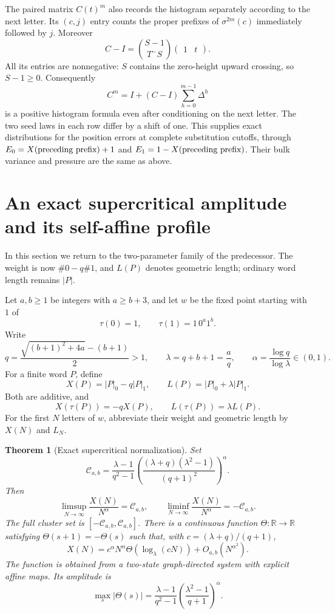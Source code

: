 \documentclass[11pt]{article}
\numberwithin{equation}{section}
\newtheorem{theorem}{Theorem}[section]
\theoremstyle{definition}
\theoremstyle{remark}
\begin{document}
The paired matrix $C(t)^m$ also records the histogram separately
according to the next letter. Its $(c,j)$ entry counts the proper
prefixes of $\sigma^{2m}(c)$ immediately followed by $j$.
Moreover
\begin{equation}\label{bmf:eq:rankone}
 C-I=
 \binom{S-1}{T^-S}\begin{pmatrix}1&t\end{pmatrix}.
\end{equation}
All its entries are nonnegative: $S$ contains the zero-height
upward crossing, so $S-1\geq0$.
Consequently
\begin{equation}\label{bmf:eq:conditioned}
 C^m=I+(C-I)\sum_{h=0}^{m-1}\Delta^h
\end{equation}
is a positive histogram formula even after conditioning on the
next letter. The two seed laws in each row differ by a shift
of one. This supplies exact distributions for the position
errors at complete substitution cutoffs, through
$E_0=X(\hbox{preceding prefix})+1$ and
$E_1=1-X(\hbox{preceding prefix})$.
Their bulk variance and pressure are the same as above.

\section{An exact supercritical amplitude and its self-affine profile}
\label{bmf:sec:supercritical}

In this section we return to the two-parameter family of the predecessor.
The weight is now $\#0-q\#1$, and $L(P)$ denotes geometric length;
ordinary word length remains $|P|$.

Let $a,b\geq1$ be integers with $a\geq b+3$, and let $w$ be the
fixed point starting with $1$ of
\[
 \tau(0)=1,\qquad \tau(1)=1\,0^a1^b.
\]
Write
\[
 q=\frac{\sqrt{(b+1)^2+4a}-(b+1)}2>1,\qquad
 \lambda=q+b+1=\frac aq,\qquad
 \alpha=\frac{\log q}{\log\lambda}\in(0,1).
\]
For a finite word $P$, define
\[
 X(P)=|P|_0-q|P|_1,\qquad
 L(P)=|P|_0+\lambda |P|_1.
\]
Both are additive, and
\[
 X(\tau(P))=-qX(P),\qquad L(\tau(P))=\lambda L(P).
\]
For the first $N$ letters of $w$, abbreviate their weight and geometric
length by $X(N)$ and $L_N$.

\begin{theorem}[Exact supercritical normalization]
\label{bmf:thm:supercritical-amplitude}
Set
\[
 \mathcal C_{a,b}=
 \frac{\lambda-1}{q^2-1}
 \left(\frac{(\lambda+q)(\lambda^2-1)}{(q+1)^2}\right)^\alpha.
\]
Then
\[
 \limsup_{N\to\infty}\frac{X(N)}{N^\alpha}=\mathcal C_{a,b},
 \qquad
 \liminf_{N\to\infty}\frac{X(N)}{N^\alpha}=-\mathcal C_{a,b}.
\]
The full cluster set is $[-\mathcal C_{a,b},\mathcal C_{a,b}]$.
There is a continuous function $\Theta:\mathbb R\to\mathbb R$ satisfying
$\Theta(s+1)=-\Theta(s)$ such that, with $c=(\lambda+q)/(q+1)$,
\[
 X(N)=c^\alpha N^\alpha\Theta(\log_\lambda(cN))
       +O_{a,b}(N^{\alpha^2}).
\]
The function is obtained from a two-state graph-directed system with
explicit affine maps. Its amplitude is
\[
 \max_s|\Theta(s)|=
 \frac{\lambda-1}{q^2-1}
 \left(\frac{\lambda^2-1}{q+1}\right)^\alpha.
\]
\end{theorem}
\end{document}
